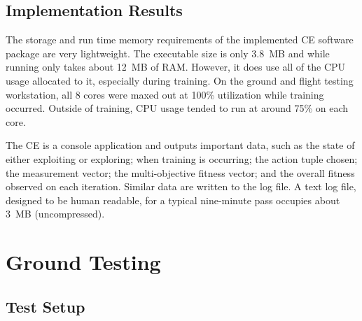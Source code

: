 \documentclass[journal]{IEEEtran}
\begin{document}
\subsection{Implementation Results}
The storage and run time memory requirements of the implemented CE software package are very lightweight.  The executable size is only 3.8~MB and while running only takes about 12~MB of RAM.  However, it does use all of the CPU usage allocated to it, especially during training.  On the ground and flight testing workstation, all 8 cores were maxed out at 100\% utilization while training occurred.  Outside of training, CPU usage tended to run at around 75\% on each core.

The CE is a console application and outputs important data, such as the state of either exploiting or exploring; when training is occurring; the action tuple chosen; the measurement vector; the multi-objective fitness vector; and the overall fitness observed on each iteration.  Similar data are written to the log file.  A text log file, designed to be human readable, for a typical nine-minute pass occupies about 3~MB (uncompressed).

\section{Ground Testing} \label{sec:ground-testing}
\subsection{Test Setup}
\end{document}
